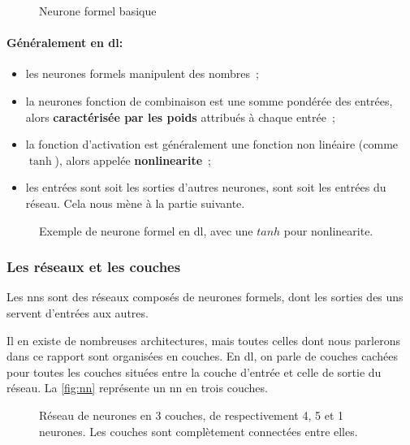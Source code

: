 \begin{figure}[h]
	\centering
	\scalebox{1}{}
	\caption{Neurone formel basique}
	\label{fig:formal_neuron}
\end{figure}

\paragraph{Généralement en \gls{dl}:}
\begin{itemize}
	\item les neurones formels manipulent des nombres~;
	\item la neurones fonction de combinaison est une somme pondérée des entrées, alors \textbf{caractérisée par les poids} attribués à chaque entrée~; \label{def:weight1}
	\item la fonction d'activation est généralement une fonction non linéaire (comme $\tanh$), alors appelée \textbf{\gls{nonlinearite}}~; \label{def:nonlinearite}
	\item les entrées sont soit les sorties d'autres neurones, sont soit les entrées du réseau. Cela nous mène à la partie suivante.
\end{itemize}

\begin{figure}[h]
	\centering
	\scalebox{1}{}
	\caption[Exemple de neurone formel en ]{Exemple de neurone formel en \gls{dl}, avec une $tanh$ pour \gls{nonlinearite}.}
	\label{fig:formal_neuron_dl}
\end{figure}

\subsubsection{Les réseaux et les couches\label{subsec:network}}
Les \glspl{nn} sont des réseaux composés de neurones formels, dont les sorties des uns servent d'entrées aux autres.

Il en existe de nombreuses architectures, mais toutes celles dont nous parlerons dans ce rapport sont organisées en couches.
En \gls{dl}, on parle de couches cachées pour toutes les couches situées entre la couche d'entrée et celle de sortie du réseau. La \autoref{fig:nn} représente un \gls{nn} en trois couches.

\begin{figure}[h]
	\centering
	\scalebox{1}{}
	\caption[Réseau de neurones en 3 couches]{Réseau de neurones en 3 couches, de respectivement 4, 5 et 1 neurones. Les couches sont complètement connectées entre elles.}
	\label{fig:nn}
\end{figure}

